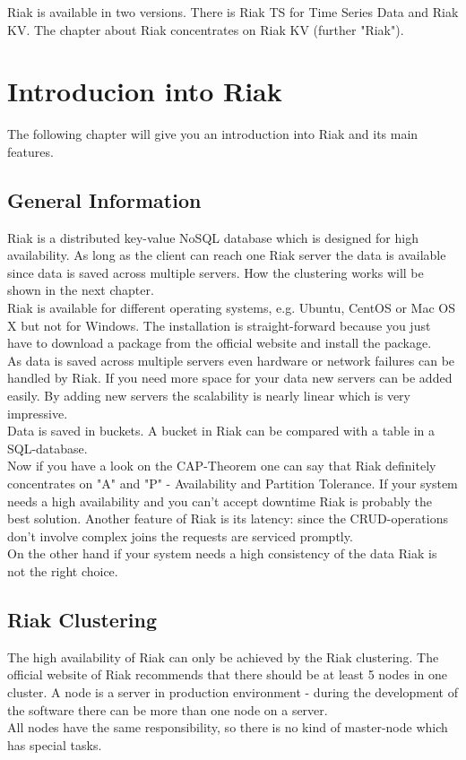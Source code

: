 Riak is available in two versions. There is Riak TS for Time Series Data and Riak KV. The chapter about Riak concentrates on Riak KV (further "Riak").
\section{Introducion into Riak}
The following chapter will give you an introduction into Riak and its main features. 
\subsection{General Information}
Riak is a distributed key-value NoSQL database which is designed for high availability. As long as the client can reach one Riak server the data is available since data is saved across multiple servers. How the clustering works will be shown in the next chapter. \cite{Basho.06.04.2017}
\\
Riak is available for different operating systems, e.g. Ubuntu, CentOS or Mac OS X but not for Windows. The installation is straight-forward because you just have to download a package from the official website and install the package. \cite{Basho.06.04.2017}
\\ 
As data is saved across multiple servers even hardware or network failures can be handled by Riak. If you need more space for your data new servers can be added easily. By adding new servers the scalability is nearly linear which is very impressive. \cite{Basho.06.04.2017}
\\
Data is saved in buckets. A bucket in Riak can be compared with a table in a SQL-database. \cite{Basho.06.04.2017}
\\ 
Now if you have a look on the CAP-Theorem one can say that Riak definitely concentrates on "A" and "P" - Availability and Partition Tolerance. If your system needs a high availability and you can't accept downtime Riak is probably the best solution. Another feature of Riak is its latency: since the CRUD-operations don't involve complex joins the requests are serviced promptly. \cite{Basho.06.04.2017}
\\
On the other hand if your system needs a high consistency of the data Riak is not the right choice. \cite{Basho.06.04.2017}
\subsection{Riak Clustering}
The high availability of Riak can only be achieved by the Riak clustering. The official website of Riak recommends that there should be at least 5 nodes in one cluster. A node is a server in production environment - during the development of the software there can be more than one node on a server. \cite{Basho.06.04.2017}
\\
All nodes have the same responsibility, so there is no kind of master-node which has special tasks. \cite{Basho.06.04.2017}

